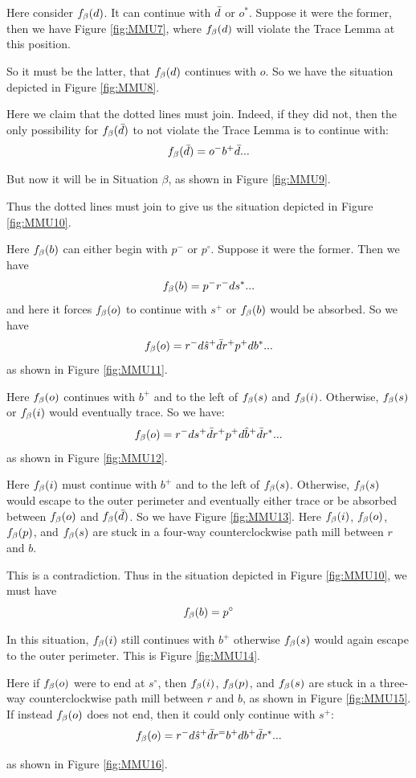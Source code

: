 Here consider $f_\beta(d)$. It can continue with $\bar{d}$ or $o^*$. Suppose it were the former, then we have Figure \ref{fig:MMU7}, where $f_\beta(d)$ will violate the Trace Lemma at this position.

So it must be the latter, that $f_\beta(d)$ continues with $o$. So we have the situation depicted in Figure \ref{fig:MMU8}.

Here we claim that the dotted lines must join. Indeed, if they did not, then the only possibility for $f_\beta(\bar{d})$ to not violate the Trace Lemma is to continue with:
\[
f_\beta(\bar{d}) = o^- b^+ \bar{d} ...
\]

But now it will be in Situation $\beta$, as shown in Figure \ref{fig:MMU9}.

Thus the dotted lines must join to give us the situation depicted in Figure \ref{fig:MMU10}.

Here $f_\beta(b)$ can either begin with $p^-$ or $p^\circ$. Suppose it were the former. Then we have
\[
f_\beta(b) = p^- r^- d s^*...
\]
and here it forces $f_\beta(o)$ to continue with $s^+$ or $f_\beta(b)$ would be absorbed. So we have
\[
f_\beta(o) = r^- d \hat{s}^+ \bar{d} r^+ p^+ d b^*...
\]
as shown in Figure \ref{fig:MMU11}.

Here $f_\beta(o)$ continues with $b^+$ and to the left of $f_\beta(s)$ and $f_\beta(i)$. Otherwise, $f_\beta(s)$ or $f_\beta(i)$ would eventually trace. So we have:
\[
f_\beta(o) = r^- d s^+ \bar{d} r^+ p^+ d \hat{b}^+ \bar{d} r^*...
\]
as shown in Figure \ref{fig:MMU12}.

Here $f_\beta(i)$ must continue with $b^+$ and to the left of $f_\beta(s)$. Otherwise, $f_\beta(s)$ would escape to the outer perimeter and eventually either trace or be absorbed between $f_\beta(o)$ and $f_\beta(\bar{d})$. So we have Figure \ref{fig:MMU13}. Here $f_\beta(i)$, $f_\beta(o)$, $f_\beta(p)$, and $f_\beta(s)$ are stuck in a four-way counterclockwise path mill between $r$ and $b$.

This is a contradiction. Thus in the situation depicted in Figure \ref{fig:MMU10}, we must have
\[
f_\beta(b) = p^\circ
\]

In this situation, $f_\beta(i)$ still continues with $b^+$ otherwise $f_\beta(s)$ would again escape to the outer perimeter. This is Figure \ref{fig:MMU14}.

Here if $f_\beta(o)$ were to end at $s^\circ$, then $f_\beta(i)$, $f_\beta(p)$, and $f_\beta(s)$ are stuck in a three-way counterclockwise path mill between $r$ and $b$, as shown in Figure \ref{fig:MMU15}. If instead $f_\beta(o)$ does not end, then it could only continue with $s^+$:
\[
f_\beta(o) = r^- d \hat{s}^+ \bar{d} r^= b^+ d b^+\bar{d} r^*...
\]

as shown in Figure \ref{fig:MMU16}. 

